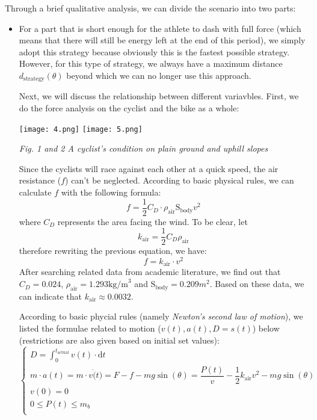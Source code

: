 \documentclass[14pt]{article}
\theoremstyle{definition}
\theoremstyle{remark}
\numberwithin{equation}{section}
\begin{document}
	Through a brief qualitative analysis, we can divide the scenario into two parts:
	\begin{itemize}
		\item For a part that is short enough for the athlete to dash with full force (which means that there will still be energy left at the end of this period), we simply adopt this strategy because obviously this is the fastest possible strategy. However, for this type of strategy, we always have a maximum distance \(d_{\mathrm{strategy}}\left(\theta\right)\) beyond which we can no longer use this approach.


			Next, we will discuss the relationship between different variavbles. First, we do the force analysis on the cyclist and the bike as a whole:

			\begin{center}
				\texttt{[image: 4.png]}
				\texttt{[image: 5.png]}

				\small \textit{Fig. 1 and 2 A cyclist's condition on plain ground and uphill slopes}
			\end{center}

			Since the cyclists will race against each other at a quick speed, the air resistance ($f$) can't be neglected. According to basic physical rules, we can calculate \(f\) with the following formula:
			$$f=\dfrac{1}{2}  C _ D  \cdot \rho_\mathrm{air} \mathrm{S}_\mathrm{body} v^2$$
			where \(C_D\) represents the area facing the wind. To be clear, let
			$$ k _\mathrm{air}=\dfrac{1}{2}  C _ D  \rho_\mathrm{air}$$
			therefore rewriting the previous equation, we have:
			$$f= k _\mathrm{air}\cdot v^2$$
			After searching related data from academic literature, we find out that $ C _ D =0.024$, $\rho_\mathrm{air}=1.293 \mathrm{kg/m}^3$ and $\mathrm{S}_\mathrm{body}=0.209 m^2$. Based on these data, we can indicate that $ k _\mathrm{air}\approx0.0032$.

			According to basic phycial rules (namely \textit{Newton's second law of motion}), we listed the formulae related to motion (\(v\left( t \right) ,a\left( t \right) ,D=s\left( t \right) \)) below (restrictions are also given based on initial set values):
			$$
			\begin{cases}
				\displaystyle
				D=\int^{t_\mathrm{actual}}_0 v(t)\cdot \mathrm{d}t\\
				m \cdot  a (t)=m \cdot v\dot(t)=F-f-mg\sin\left(\theta\right)=\dfrac{P (t)}{v}-\dfrac{1}{2} k_{\mathrm{air}} v^2-mg\sin\left(\theta\right)\\
				v(0)=0\\
				0\leq P (t)\leq m_ b\\
			\end{cases}
			$$


\end{itemize}
\end{document}
